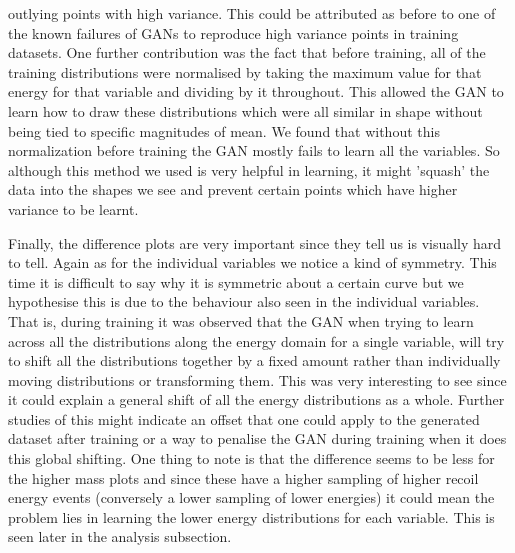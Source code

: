\documentclass[11pt]{article} %
\begin{document}
outlying points with high variance.
This could be attributed as before to one of the known failures of GANs to reproduce high variance points in training datasets.
One further contribution was the fact that before training, all of the training distributions were normalised
by taking the maximum value for that energy for that variable and dividing by it throughout.
This allowed the GAN to learn how to draw these distributions which were all similar in shape without
being tied to specific magnitudes of mean.
We found that without this normalization before training the GAN mostly fails to learn all the variables.
So although this method we used is very helpful in learning, it might 'squash' the data into the shapes we see and prevent certain points
which have higher variance to be learnt.
\\
\par Finally, the difference plots are very important since they tell us is visually hard to tell.
Again as for the individual variables we notice a kind of symmetry.
This time it is difficult to say why it is symmetric about a certain curve but we hypothesise
this is due to the behaviour also seen in the individual variables.
That is, during training it was observed that the GAN when trying to learn across all the distributions along the energy domain
for a single variable, will try to shift all the distributions together by a fixed amount rather than individually moving
distributions or transforming them.
This was very interesting to see since it could explain a general shift of all the energy distributions as a whole.
Further studies of this might indicate an offset that one could apply to the generated dataset after training
 or a way to penalise the GAN during training when it does this global shifting.
One thing to note is that the difference seems to be less for the higher mass plots and since these have a higher sampling of
higher recoil energy events (conversely a lower sampling of lower energies) it could mean the problem lies in learning the lower energy distributions for each variable.
This is seen later in the analysis subsection.
\end{document}
